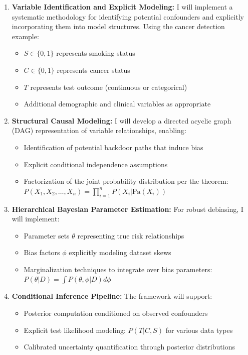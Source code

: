 \documentclass[12pt]{article}
\begin{document}
\begin{enumerate}
    \item \textbf{Variable Identification and Explicit Modeling:} I will implement a systematic methodology for identifying potential confounders and explicitly incorporating them into model structures. Using the cancer detection example:
    
    \begin{itemize}
        \item $S \in \{0, 1\}$ represents smoking status
        \item $C \in \{0, 1\}$ represents cancer status
        \item $T$ represents test outcome (continuous or categorical)
        \item Additional demographic and clinical variables as appropriate
    \end{itemize}
    
    \item \textbf{Structural Causal Modeling:} I will develop a directed acyclic graph (DAG) representation of variable relationships, enabling:
    
    \begin{itemize}
        \item Identification of potential backdoor paths that induce bias
        \item Explicit conditional independence assumptions
        \item Factorization of the joint probability distribution per the theorem: 
        $P(X_1, X_2, \ldots, X_n) = \prod_{i=1}^{n} P(X_i | \text{Pa}(X_i))$
    \end{itemize}
    
    \item \textbf{Hierarchical Bayesian Parameter Estimation:} For robust debiasing, I will implement:
    
    \begin{itemize}
        \item Parameter sets $\theta$ representing true risk relationships
        \item Bias factors $\phi$ explicitly modeling dataset skews
        \item Marginalization techniques to integrate over bias parameters:
        $P(\theta | D) = \int P(\theta, \phi | D) d\phi$
    \end{itemize}
    
    \item \textbf{Conditional Inference Pipeline:} The framework will support:
    
    \begin{itemize}
        \item Posterior computation conditioned on observed confounders
        \item Explicit test likelihood modeling: $P(T | C, S)$ for various data types
        \item Calibrated uncertainty quantification through posterior distributions
    \end{itemize}
\end{enumerate}
\end{document}
